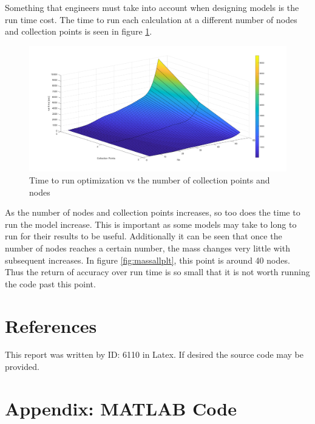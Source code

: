 \documentclass[12pt]{article}
\begin{document}
	Something that engineers must take into account when designing models is the run time cost. The time to run each calculation at a different number of nodes and collection points is seen in figure \ref{fig:comptime}.\par 
	\begin{figure}[H]
		\centering
		\includegraphics[width=0.7\linewidth]{runTimePlt}
		\caption{Time to run optimization vs the number of collection points and nodes}
		\label{fig:comptime}
	\end{figure}
	
	 As the number of nodes and collection points increases, so too does the time to run the model increase. This is important as some models may take to long to run for their results to be useful. Additionally it can be seen that once the number of nodes reaches a certain number, the mass changes very little with subsequent increases. In figure \ref{fig:massallplt}, this point is around 40 nodes. Thus the return of accuracy over run time is so small that it is not worth running the code past this point.\par 

	
	
		
	\section{References}
	\label{sec:References}
		
	\noindent This report was written by ID: 6110 in Latex. If desired the source code may be provided.\par 
	\section{Appendix: MATLAB Code}
	
\end{document}
